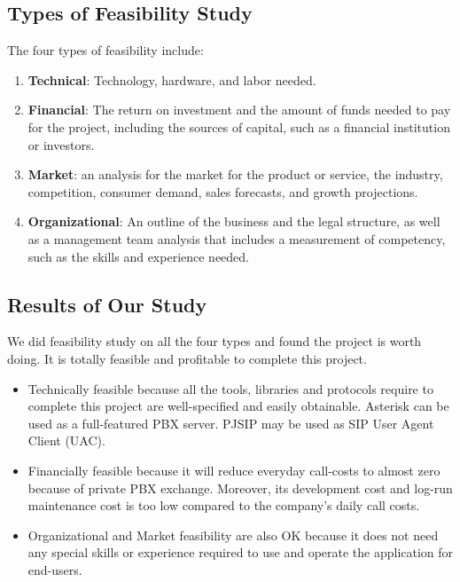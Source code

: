 \subsection{Types of Feasibility Study}
The four types of feasibility include:
\begin{enumerate}
 \item \textbf{Technical}: Technology, hardware, and labor needed.
 \item \textbf{Financial}: The return on investment and the amount of funds needed to pay for the project, including the sources of capital, such as a financial institution or investors.
 \item \textbf{Market}: an analysis for the market for the product or service, the industry, competition, consumer demand, sales forecasts, and growth projections.
 \item \textbf{Organizational}: An outline of the business and the legal structure, as well as a management team analysis that includes a measurement of competency, such as the skills and experience needed.
\end{enumerate}

\subsection{Results of Our Study}

We did feasibility study on all the four types and found the project is worth doing. It is totally feasible and profitable to complete this project.

\begin{itemize}
 \item Technically feasible because all the tools, libraries and protocols require to complete this project are well-specified and easily obtainable. Asterisk can be used as a full-featured PBX server. PJSIP may be used as SIP User Agent Client (UAC).

 \item Financially feasible because it will reduce everyday call-costs to almost zero because of private PBX exchange. Moreover, its development cost and log-run maintenance cost is too low compared to the company's daily call costs.

 \item Organizational and Market feasibility are also OK because it does not need any special skills or experience required to use and operate the application for end-users.

\end{itemize}
